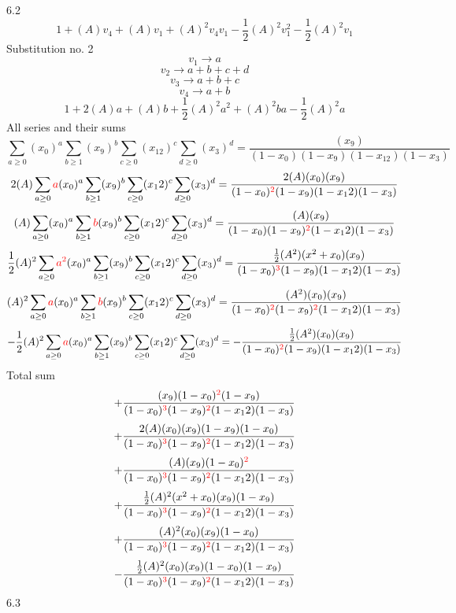 \documentclass{article}
\begin{document}
6.2
\[1+(A)v_4+(A)v_1+(A)^2v_4v_1-\frac{1}{2}(A)^2v_1^{2}-\frac{1}{2}(A)^2v_1\]Substitution no. 2\[v_1\rightarrow{a}\]\[v_2\rightarrow{a+b+c+d}\]\[v_3\rightarrow{a+b+c}\]\[v_4\rightarrow{a+b}\]\[1+2(A)a+(A)b+\frac{1}{2}(A)^2a^{2}+(A)^2ba-\frac{1}{2}(A)^2a\]All series and their sums\[\sum_{a\geq{0}}(x_0)^{a}\sum_{b\geq{1}}(x_9)^{b}\sum_{c\geq{0}}(x_12)^{c}\sum_{d\geq{0}}(x_3)^{d}=\frac{(x_9)}{(1-x_0)(1-x_9)(1-x_12)(1-x_3)}\]\[2(A)\sum_{a\geq{0}}\textcolor{red}{a}(x_0)^{a}\sum_{b\geq{1}}(x_9)^{b}\sum_{c\geq{0}}(x_12)^{c}\sum_{d\geq{0}}(x_3)^{d}=\frac{2(A)(x_0)(x_9)}{(1-x_0)^{\textcolor{red}{2}}(1-x_9)(1-x_12)(1-x_3)}\]\[(A)\sum_{a\geq{0}}(x_0)^{a}\sum_{b\geq{1}}\textcolor{red}{b}(x_9)^{b}\sum_{c\geq{0}}(x_12)^{c}\sum_{d\geq{0}}(x_3)^{d}=\frac{(A)(x_9)}{(1-x_0)(1-x_9)^{\textcolor{red}{2}}(1-x_12)(1-x_3)}\]\[\frac{1}{2}(A)^{2}\sum_{a\geq{0}}\textcolor{red}{a^{2}}(x_0)^{a}\sum_{b\geq{1}}(x_9)^{b}\sum_{c\geq{0}}(x_12)^{c}\sum_{d\geq{0}}(x_3)^{d}=\frac{\frac{1}{2}(A^{2})(x^{2}+x_0)(x_9)}{(1-x_0)^{\textcolor{red}{3}}(1-x_9)(1-x_12)(1-x_3)}\]\[(A)^{2}\sum_{a\geq{0}}\textcolor{red}{a}(x_0)^{a}\sum_{b\geq{1}}\textcolor{red}{b}(x_9)^{b}\sum_{c\geq{0}}(x_12)^{c}\sum_{d\geq{0}}(x_3)^{d}=\frac{(A^{2})(x_0)(x_9)}{(1-x_0)^{\textcolor{red}{2}}(1-x_9)^{\textcolor{red}{2}}(1-x_12)(1-x_3)}\]\[-\frac{1}{2}(A)^{2}\sum_{a\geq{0}}\textcolor{red}{a}(x_0)^{a}\sum_{b\geq{1}}(x_9)^{b}\sum_{c\geq{0}}(x_12)^{c}\sum_{d\geq{0}}(x_3)^{d}=-\frac{\frac{1}{2}(A^{2})(x_0)(x_9)}{(1-x_0)^{\textcolor{red}{2}}(1-x_9)(1-x_12)(1-x_3)}\]
Total sum
\[+\frac{(x_9)(1-x_0)^{\textcolor{red}{2}}(1-x_9)}{(1-x_0)^{\textcolor{red}{3}}(1-x_9)^{\textcolor{red}{2}}(1-x_12)(1-x_3)}\]\[+\frac{2(A)(x_0)(x_9)(1-x_9)(1-x_0)}{(1-x_0)^{\textcolor{red}{3}}(1-x_9)^{\textcolor{red}{2}}(1-x_12)(1-x_3)}\]\[+\frac{(A)(x_9)(1-x_0)^{\textcolor{red}{2}}}{(1-x_0)^{\textcolor{red}{3}}(1-x_9)^{\textcolor{red}{2}}(1-x_12)(1-x_3)}\]\[+\frac{\frac{1}{2}(A)^{2}(x^{2}+x_0)(x_9)(1-x_9)}{(1-x_0)^{\textcolor{red}{3}}(1-x_9)^{\textcolor{red}{2}}(1-x_12)(1-x_3)}\]\[+\frac{(A)^{2}(x_0)(x_9)(1-x_0)}{(1-x_0)^{\textcolor{red}{3}}(1-x_9)^{\textcolor{red}{2}}(1-x_12)(1-x_3)}\]\[-\frac{\frac{1}{2}(A)^{2}(x_0)(x_9)(1-x_0)(1-x_9)}{(1-x_0)^{\textcolor{red}{3}}(1-x_9)^{\textcolor{red}{2}}(1-x_12)(1-x_3)}\]
6.3
\end{document}
